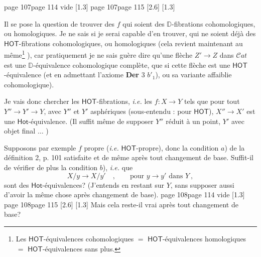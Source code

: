 \documentclass[11pt,leqno]{article}
\newcommand{\printedpage}[1]{\marginnote{\scriptsize\sffamily ed.\ #1}}
\newcommand{\msp}[1]{%
  \begingroup\def\thismsp{#1}\def\blankmsp{page 114 vide}%
  \ifx\thismsp\blankmsp
    \marginnote{\scriptsize\sffamily [114: vide]}[1.3\baselineskip]%
  \else\def\followingmsp{page 115}%
    \ifx\thismsp\followingmsp
      \marginnote{\scriptsize\sffamily [page 115]}[2.6\baselineskip]%
    \else\marginnote{\scriptsize\sffamily [#1]}[1.3\baselineskip]\fi
  \fi\endgroup}
\newcommand{\DD}{\ensuremath{\mathbb{D}}}
\newcommand{\Hot}{\ensuremath{\mathsf{Hot}}}
\newcommand{\HOT}{\ensuremath{\mathsf{HOT}}}
\newcommand{\Cat}{\ensuremath{\mathcal{C}at}}
\begin{document}
\printedpage{64}

\msp{page 107}

Il se pose la question de trouver des $f$ qui soient des $\DD$-fibrations cohomologiques, ou homologiques. Je ne sais si je serai capable d'en trouver, qui ne soient déjà des \HOT-fibrations cohomologiques, ou homologiques (cela revient maintenant au même\footnote[55]{Les \HOT-équivalences cohomologiques $=$ \HOT-équivalences homologiques $=$ \HOT-équivalences sans plus.} ), car pratiquement je ne sais guère dire qu'une flèche $Z' \to Z$ dans $\Cat$ est une $\DD$-équivalence cohomologique complète, que si cette flèche est une \HOT-équivalence (et en admettant l'axiome \textbf{Der} 3 $b'_1$), ou sa variante affaiblie cohomologique).

Je vais donc chercher les \HOT-fibrations, \textit{i.e.} les $f : X \to Y$ tels que pour tout $Y'' \to Y' \to Y$, avec $Y''$ et $Y'$ asphériques (sous-entendu : pour \HOT), $X'' \to X'$ est une \Hot-équivalence. (Il suffit même de supposer $Y''$ réduit à un point, $Y'$ avec objet final $\ldots$ )

Supposons par exemple $f$ propre (\textit{i.e.} \HOT-propre), donc la condition $a$) de la définition 2, p. 101 satisfaite et de même après tout changement de base. Suffit-il de vérifier de plus la condition $b$), \textit{i.e.} que
\[ X/y \longrightarrow X/y' \quad , \qquad \text{pour } y \to y' \text{ dans } Y \ , \]
sont des \Hot-équivalences? (J'entends en restant sur $Y$, sans supposer aussi d'avoir la même chose après changement de base).
\msp{page 108}
Mais cela reste-il vrai après tout changement de base? %
\end{document}
